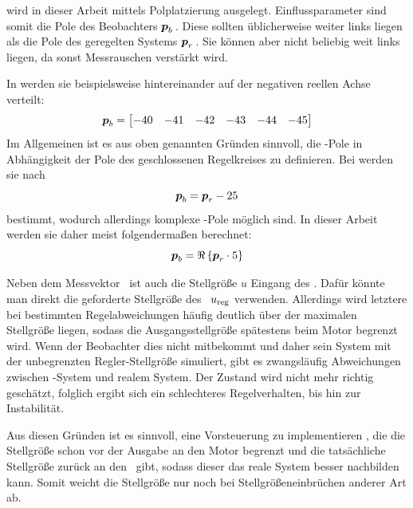  wird in dieser Arbeit mittels Polplatzierung ausgelegt. 
Einflussparameter sind somit die Pole des Beobachters $\boldsymbol{p}_b$\,. 
Diese sollten üblicherweise weiter links liegen als die Pole des geregelten Systems $\boldsymbol{p}_r$\,. 
Sie können aber nicht beliebig weit links liegen, da sonst Messrauschen verstärkt wird.

In \cite{brehl} werden sie beispielsweise hintereinander auf der negativen reellen Achse verteilt:
	\[
	\boldsymbol{p}_b=\begin{bmatrix}
		-40 & -41 & -42 & -43 & -44 & -45
	\end{bmatrix}
\]
Im Allgemeinen ist es aus oben genannten Gründen sinnvoll, die \beob-Pole in Abhängigkeit der Pole des geschlossenen Regelkreises zu definieren.
Bei \cite{chang} werden sie nach
	\[
	\boldsymbol{p}_b = \boldsymbol{p}_r - 25
\]
bestimmt, wodurch allerdings komplexe \beob-Pole möglich sind. In dieser Arbeit werden sie daher meist folgendermaßen berechnet:
	\[
	\boldsymbol{p}_b = \Re\left\{{\boldsymbol{p}_r \cdot 5}\right\}
\]

Neben dem Messvektor \vey\ ist auch die Stellgröße $u$ Eingang des \beob. 
Dafür könnte man direkt die geforderte Stellgröße des \zsr\ $u_{\mathrm{reg}}$ verwenden.
Allerdings wird letztere bei bestimmten Regelabweichungen häufig deutlich über der maximalen Stellgröße liegen, sodass die Ausgangsstellgröße spätestens beim Motor begrenzt wird.
Wenn der Beobachter dies nicht mitbekommt und daher sein System mit der unbegrenzten Regler-Stellgröße simuliert, gibt es zwangsläufig Abweichungen zwischen \beob-System und realem System.
Der Zustand wird nicht mehr richtig geschätzt, folglich ergibt sich ein schlechteres Regelverhalten, bis hin zur Instabilität.

Aus diesen Gründen ist es sinnvoll, eine Vorsteuerung zu implementieren , die die Stellgröße schon vor der Ausgabe an den Motor begrenzt und die tatsächliche Stellgröße zurück an den \beob\ gibt, sodass dieser das reale System besser nachbilden kann.
Somit weicht die Stellgröße nur noch bei Stellgrößeneinbrüchen anderer Art  ab.


